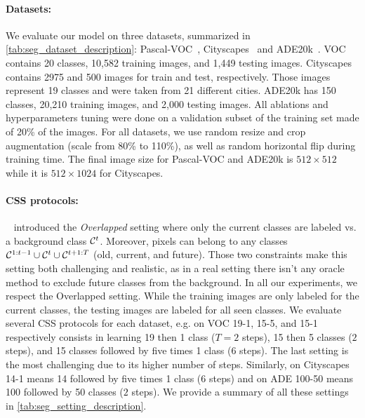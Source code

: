 \paragraph{Datasets:\,} We evaluate our model on three datasets, summarized in
\autoref{tab:seg_dataset_description}: Pascal-VOC~\cite{everingham2015pascalvoc},
Cityscapes~\cite{cordts2016cityscapes} and ADE20k~\cite{zhou2017adedataset}. VOC contains 20
classes, 10,582 training images, and 1,449 testing images. Cityscapes contains 2975 and 500 images
for train and test, respectively. Those images represent 19 classes and were taken from 21 different
cities. ADE20k has 150 classes, 20,210 training images, and 2,000 testing images. All ablations and
hyperparameters tuning were done on a validation subset of the training set made of 20\% of the
images. For all datasets, we use random resize and crop augmentation (scale from 80\% to 110\%), as
well as random horizontal flip during training time. The final image size for Pascal-VOC and ADE20k
is $512 \times 512$ while it is $512 \times 1024$ for Cityscapes.

\paragraph{CSS protocols:\,} ~\cite{cermelli2020modelingthebackground} introduced the
\textit{Overlapped} setting where only the current classes are labeled vs. a background class
$\mathcal{C}^t$. Moreover, pixels can belong to any classes $\mathcal{C}^{1:t-1} \cup \mathcal{C}^{t} \cup \mathcal{C}^{t+1:T}$
(old, current, and future). Those two constraints make this setting both challenging and realistic,
as in a real setting there isn't any oracle method to exclude future classes from the background. In
all our experiments, we respect the Overlapped setting. While the training images are only labeled
for the current classes, the testing images are labeled for all seen classes. We evaluate several
\ac{CSS} protocols for each dataset, e.g. on VOC 19-1, 15-5, and 15-1 respectively consists in learning
19 then 1 class ($T=2$ steps), 15 then 5 classes ($2$ steps), and 15 classes followed by five times
1 class ($6$ steps). The last setting is the most challenging due to its higher number of steps.
Similarly, on Cityscapes 14-1 means 14 followed by five times 1 class ($6$ steps) and on ADE 100-50
means 100 followed by 50 classes ($2$ steps). We provide a summary of all these settings in
\autoref{tab:seg_setting_description}.

